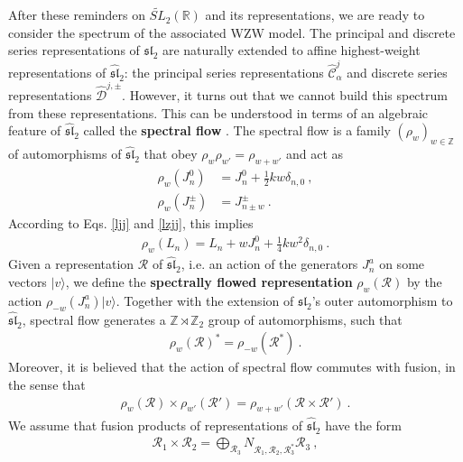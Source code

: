 \documentclass[12pt, a4paper, notitlepage, twoside]{report}
\numberwithin{equation}{section}
\theoremstyle{break}
\begin{document}
After these reminders on $\widetilde{SL}_2(\mathbb{R})$ and its representations, we are ready to consider the spectrum of the associated WZW model.
The principal and discrete series representations of $\mathfrak{sl}_2$ are naturally extended to affine highest-weight representations of $\widehat{\mathfrak{sl}}_2$: the principal series representations $\hat{\mathcal{C}}^j_\alpha$ and discrete series representations $\hat{\mathcal{D}}^{j,\pm}$.
However, it turns out that we cannot build this spectrum from these representations.
This can be understood in terms of an algebraic feature of $\widehat{\mathfrak{sl}}_2$ called the \textbf{\boldmath spectral flow} \cite{mo00a}.
The spectral flow is a family $(\rho_w)_{w\in{\mathbb{Z}}}$ of automorphisms of $\widehat{\mathfrak{sl}}_2$ that obey $\rho_w\rho_{w'}=\rho_{w+w'}$ and act as 
\begin{align}
 \rho_w(J^0_n)&=  J^0_n + \frac12 kw \delta_{n,0}   \ ,
\\
 \rho_w(J^\pm_n) &= J^\pm_{n\pm w}  \ .
\end{align}
According to Eqs. \eqref{ljj} and \eqref{lzjj}, this implies
\begin{align}
 \rho_w(L_n)  = L_n + wJ^0_n +\frac14 kw^2 \delta_{n,0}\ .
\end{align}
Given a representation $\mathcal{R}$ of $\widehat{\mathfrak{sl}}_2$, i.e. an action of the generators $J^a_n$ on some vectors $|v\rangle$, we define the \textbf{\boldmath spectrally flowed representation} $\rho_w(\mathcal{R})$ by the action $\rho_{-w}(J^a_n)|v\rangle$.  
Together with the extension of $\mathfrak{sl}_2$'s outer automorphism to $\widehat{\mathfrak{sl}}_2$, spectral flow generates a $\mathbb{Z}\rtimes \mathbb{Z}_2$ group of automorphisms, such that
\begin{align}
 \rho_w(\mathcal{R})^* = \rho_{-w}(\mathcal{R}^*)\ .
\end{align}
Moreover, it is believed that the action of spectral flow commutes with fusion, in the sense that \cite{gab01b}
\begin{align}
 \rho_{w}(\mathcal{R})\times \rho_{w'}(\mathcal{R}') = \rho_{w+w'}(\mathcal{R}\times \mathcal{R}')\ .
\label{rwr}
\end{align}
We assume that fusion products of representations of $\widehat{\mathfrak{sl}}_2$ have the form 
\begin{align}
 \mathcal{R}_1\times \mathcal{R}_2 = \bigoplus_{\mathcal{R}_3} N_{\mathcal{R}_1,\mathcal{R}_2,\mathcal{R}_3^*} \mathcal{R}_3\ ,
\end{align}
\end{document}
